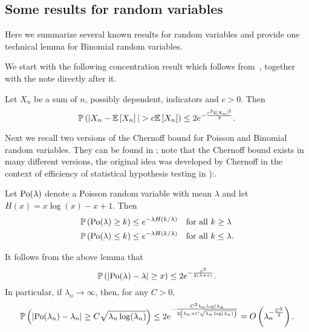 \begin{appendices}
\section{Some results for random variables}

Here we summarize several known results for random variables and provide one technical lemma for Binomial random variables.

We start with the following concentration result which follows from~\cite[Theorem 4]{freedman1973another}, together with the note directly after it.

\begin{lemma}\label{lem:general_concentration_sum_indicators}
Let $X_n$ be a sum of $n$, possibly dependent, indicators and $c > 0$. Then
\[
	\mathbb{P}\left(|X_n - \mathbb{E}\left[X_n\right]| > c \mathbb{E}\left[X_n\right]\right) \le 2 e^{-\frac{c^2 \mathbb{E}\left[X_n\right]^2}{2}}.
\]
\end{lemma}

Next we recall two versions of the Chernoff bound for Poisson and Binomial random variables. They can be found in \cite[Lemma 1.2]{penrose2003random}; note that the Chernoff bound exists in many different versions, the original idea was developed by Chernoff in the context of efficiency of statistical hypothesis testing in \cite{Chernoff1952}):.

\begin{lemma}
Let ${\mathrm{Po}}(\lambda)$ denote a Poisson random variable with mean $\lambda$ and let $H(x) = x\log(x) - x + 1$. Then
\begin{align*}
	&\mathbb{P}\left({\mathrm{Po}}(\lambda) \ge k\right) \le e^{-\lambda H(k/\lambda)} \quad \text{for all } k \ge \lambda\\
	&\mathbb{P}\left({\mathrm{Po}}(\lambda) \le k\right) \le e^{-\lambda H(k/\lambda)} \quad \text{for all } k \le \lambda.
\end{align*}
\end{lemma}

It follows from the above lemma that
\begin{equation}\label{eq:def_chernoff_bound_poisson}
	\mathbb{P}\left(\left|\mathrm{Po}(\lambda) - \lambda\right| \ge x\right) \le 2e^{-\frac{x^2}{2(\lambda + x)}}.
\end{equation}
In particular, if $\lambda_n \to \infty$, then, for any $C>0$,
\begin{equation}\label{eq:def_chernoff_bound_poisson_C}
	\mathbb{P}\left(\left|\mathrm{Po}(\lambda_n) - \lambda_n\right| \ge C \sqrt{\lambda_n\log(\lambda_n)}\right) \le 2e^{-\frac{C^2 \lambda_n \log(\lambda_n}{2\left(\lambda_n + C\sqrt{\lambda_n\log(\lambda_n)}\right)}}
	= O\left(\lambda_n^{-\frac{C^2}{2}}\right).
\end{equation}


\end{appendices}
